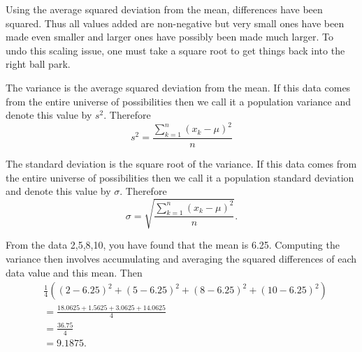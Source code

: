 \documentclass[10pt,]{book}
\theoremstyle{plain}
\theoremstyle{definition}
\theoremstyle{definition}
\theoremstyle{definition}
\numberwithin{equation}{section}
\begin{document}
Using the average squared deviation from the mean, differences have been squared. Thus all values added are non-negative but very small ones have been made even smaller and larger ones have possibly been made much larger. To undo this scaling issue, one must take a square root to get things back into the right ball park. 
%
\par
The variance is the average squared deviation from the mean. If this data comes from the entire universe of possibilities then we call it a population variance and denote this value by \(s^2\). Therefore
	\begin{equation*}s^2 = \frac{\sum_{k=1}^n ( x_k-\mu )^2}{n} \end{equation*}
%
\par
The standard deviation is the square root of the variance. If this data comes from the entire universe of possibilities then we call it a population standard deviation and denote this value by \(\sigma\). Therefore
\begin{equation*} \sigma = \sqrt{\frac{\sum_{k=1}^n ( x_k-\mu )^2}{n}}.\end{equation*}
%
\par
From the data {2,5,8,10}, you have found that the mean is 6.25. Computing the variance then involves accumulating and averaging the squared differences of each data value and this mean. Then
\begin{align*}
& \frac{1}{4} \left ( (2-6.25)^2 + (5-6.25)^2 + (8-6.25)^2 + (10-6.25)^2 \right ) \\
& = \frac{18.0625 + 1.5625 + 3.0625 + 14.0625}{4} \\
& = \frac{36.75}{4}\\
& = 9.1875.
\end{align*}
%
\par
\end{document}
